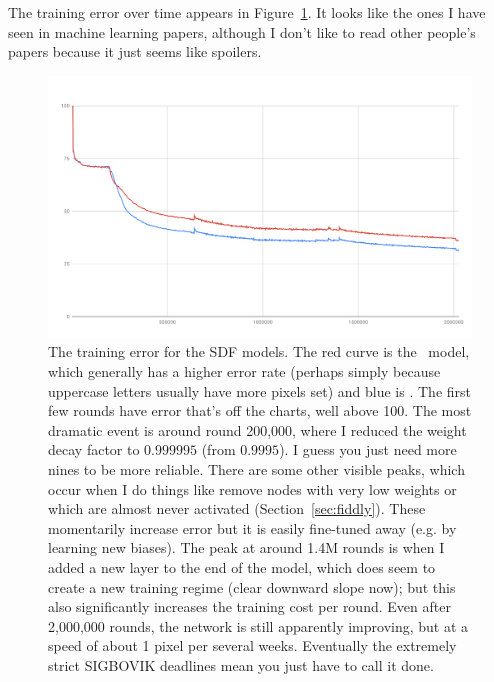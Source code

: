 \documentclass[twocolumn]{article} %
\begin{document}
The training error over time appears in
Figure~\ref{fig:sdfmergederror}. It looks like the ones I have seen in
machine learning papers, although I don't like to read other people's
papers because it just seems like spoilers.

\begin{figure}[ht]
\centering
  \includegraphics[width=0.99 \linewidth]{sdfmergederror}
\caption{ The training error for the SDF models. The red curve is the
  \makeuppercase\ model, which generally has a higher error rate
  (perhaps simply because uppercase letters usually have more pixels
  set) and blue is \makelowercase. The first few rounds have error
  that's off the charts, well above 100. The most dramatic event is
  around round 200,000, where I reduced the weight decay factor to
  $0.999995$ (from $0.9995$). I guess you just need more nines to be
  more reliable. There are some other visible peaks, which occur when
  I do things like remove nodes with very low weights or which are
  almost never activated (Section~\ref{sec:fiddly}). These momentarily
  increase error but it is easily fine-tuned away (e.g. by learning
  new biases). The peak at around 1.4M rounds is when I added a new
  layer to the end of the model, which does seem to create a new
  training regime (clear downward slope now); but this also
  significantly increases the training cost per round. Even after
  2,000,000 rounds, the network is still apparently improving, but at
  a speed of about 1 pixel per several weeks. Eventually the extremely
  strict SIGBOVIK deadlines mean you just have to call it done.
} \label{fig:sdfmergederror}
\end{figure}




\label{sec:fiddly}
\end{document}
